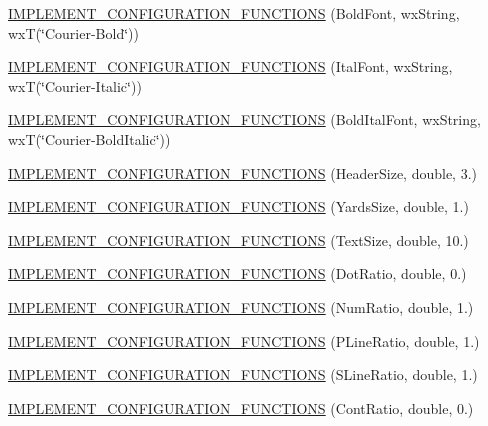 \begin{DoxyCompactItemize}
\item 
\hyperlink{a00190_a6610040e59162745a8eee1250841fc49}{I\-M\-P\-L\-E\-M\-E\-N\-T\-\_\-\-C\-O\-N\-F\-I\-G\-U\-R\-A\-T\-I\-O\-N\-\_\-\-F\-U\-N\-C\-T\-I\-O\-N\-S} (Bold\-Font, wx\-String, wx\-T(\char`\"{}Courier-\/Bold\char`\"{}))
\item 
\hyperlink{a00190_a857d70831b3ede75193c3b1b361f6807}{I\-M\-P\-L\-E\-M\-E\-N\-T\-\_\-\-C\-O\-N\-F\-I\-G\-U\-R\-A\-T\-I\-O\-N\-\_\-\-F\-U\-N\-C\-T\-I\-O\-N\-S} (Ital\-Font, wx\-String, wx\-T(\char`\"{}Courier-\/Italic\char`\"{}))
\item 
\hyperlink{a00190_a69e36e999f34b2aeb08bc632e01589b4}{I\-M\-P\-L\-E\-M\-E\-N\-T\-\_\-\-C\-O\-N\-F\-I\-G\-U\-R\-A\-T\-I\-O\-N\-\_\-\-F\-U\-N\-C\-T\-I\-O\-N\-S} (Bold\-Ital\-Font, wx\-String, wx\-T(\char`\"{}Courier-\/Bold\-Italic\char`\"{}))
\item 
\hyperlink{a00190_a27e81cf65c3afeb7276ae9d4dae28a54}{I\-M\-P\-L\-E\-M\-E\-N\-T\-\_\-\-C\-O\-N\-F\-I\-G\-U\-R\-A\-T\-I\-O\-N\-\_\-\-F\-U\-N\-C\-T\-I\-O\-N\-S} (Header\-Size, double, 3.)
\item 
\hyperlink{a00190_aab868c332391ed0b70a0e99eedaba4c7}{I\-M\-P\-L\-E\-M\-E\-N\-T\-\_\-\-C\-O\-N\-F\-I\-G\-U\-R\-A\-T\-I\-O\-N\-\_\-\-F\-U\-N\-C\-T\-I\-O\-N\-S} (Yards\-Size, double, 1.)
\item 
\hyperlink{a00190_a3d1df20f4c96f149903857ead0a1101e}{I\-M\-P\-L\-E\-M\-E\-N\-T\-\_\-\-C\-O\-N\-F\-I\-G\-U\-R\-A\-T\-I\-O\-N\-\_\-\-F\-U\-N\-C\-T\-I\-O\-N\-S} (Text\-Size, double, 10.)
\item 
\hyperlink{a00190_abdd22a7d20ff4b5080c0ae32b53da90f}{I\-M\-P\-L\-E\-M\-E\-N\-T\-\_\-\-C\-O\-N\-F\-I\-G\-U\-R\-A\-T\-I\-O\-N\-\_\-\-F\-U\-N\-C\-T\-I\-O\-N\-S} (Dot\-Ratio, double, 0.)
\item 
\hyperlink{a00190_afd7fd2aa6e4627640a7a5f23e05587f1}{I\-M\-P\-L\-E\-M\-E\-N\-T\-\_\-\-C\-O\-N\-F\-I\-G\-U\-R\-A\-T\-I\-O\-N\-\_\-\-F\-U\-N\-C\-T\-I\-O\-N\-S} (Num\-Ratio, double, 1.)
\item 
\hyperlink{a00190_a8dd1c41f21b8abcfc836327829cacdd4}{I\-M\-P\-L\-E\-M\-E\-N\-T\-\_\-\-C\-O\-N\-F\-I\-G\-U\-R\-A\-T\-I\-O\-N\-\_\-\-F\-U\-N\-C\-T\-I\-O\-N\-S} (P\-Line\-Ratio, double, 1.)
\item 
\hyperlink{a00190_af8311192a96a072bb88043b920a9ca20}{I\-M\-P\-L\-E\-M\-E\-N\-T\-\_\-\-C\-O\-N\-F\-I\-G\-U\-R\-A\-T\-I\-O\-N\-\_\-\-F\-U\-N\-C\-T\-I\-O\-N\-S} (S\-Line\-Ratio, double, 1.)
\item 
\hyperlink{a00190_a25c385e016075fed309e10e66c3fa16a}{I\-M\-P\-L\-E\-M\-E\-N\-T\-\_\-\-C\-O\-N\-F\-I\-G\-U\-R\-A\-T\-I\-O\-N\-\_\-\-F\-U\-N\-C\-T\-I\-O\-N\-S} (Cont\-Ratio, double, 0.)

\end{DoxyCompactItemize}
